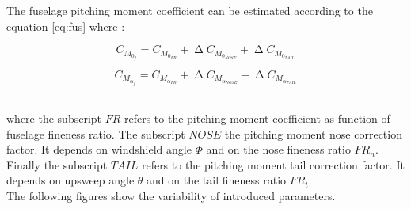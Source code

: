 The fuselage pitching moment coefficient can be estimated according to the equation \ref{eq:fus} where :

\begin{equation}
C_{M_{0_f}} = C_{M_{0_{FR}}} + \upDelta C_{M_{0_{NOSE}}} +  \upDelta C_{M_{0_{TAIL}}}
\end{equation}

\begin{equation}
C_{M_{{\alpha}_f}} = C_{M_{{\alpha}_{FR}}} + \upDelta C_{M_{{\alpha}_{NOSE}}} +  \upDelta C_{M_{{\alpha}_{TAIL}}}
\end{equation}

\noindent \\

where the subscript $FR$ refers to the pitching moment coefficient as function of fuselage fineness ratio. The subscript $NOSE$ the pitching moment nose correction factor. It depends on windshield angle $\Phi$ and on the nose fineness ratio $FR_n$. Finally the subscript $TAIL$ refers to the pitching moment tail correction factor. It depends on upsweep angle $\theta$ and on the tail fineness ratio $FR_t$.\\
The following figures show the variability of introduced parameters.

